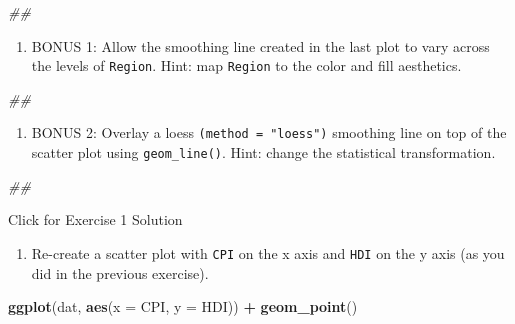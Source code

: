 \documentclass[]{book}
\newenvironment{Shaded}{\begin{snugshade}}{\end{snugshade}}
\newcommand{\CommentTok}[1]{\textcolor[rgb]{0.56,0.35,0.01}{\textit{#1}}}
\newcommand{\DataTypeTok}[1]{\textcolor[rgb]{0.13,0.29,0.53}{#1}}
\newcommand{\KeywordTok}[1]{\textcolor[rgb]{0.13,0.29,0.53}{\textbf{#1}}}
\newcommand{\NormalTok}[1]{#1}
\newcommand{\OperatorTok}[1]{\textcolor[rgb]{0.81,0.36,0.00}{\textbf{#1}}}
\newcommand{\StringTok}[1]{\textcolor[rgb]{0.31,0.60,0.02}{#1}}
\providecommand{\tightlist}{%
  \setlength{\itemsep}{0pt}\setlength{\parskip}{0pt}}
\begin{document}
\begin{Shaded}
\begin{Highlighting}[]
\CommentTok{## }
\end{Highlighting}
\end{Shaded}

\begin{enumerate}
\def\labelenumi{\arabic{enumi}.}
\setcounter{enumi}{4}
\tightlist
\item
  BONUS 1: Allow the smoothing line created in the last plot to vary across the levels of \texttt{Region}. Hint: map \texttt{Region} to the color and fill aesthetics.
\end{enumerate}

\begin{Shaded}
\begin{Highlighting}[]
\CommentTok{## }
\end{Highlighting}
\end{Shaded}

\begin{enumerate}
\def\labelenumi{\arabic{enumi}.}
\setcounter{enumi}{5}
\tightlist
\item
  BONUS 2: Overlay a loess \texttt{(method\ =\ "loess")} smoothing line on top of the scatter plot using \texttt{geom\_line()}. Hint: change the statistical transformation.
\end{enumerate}

\begin{Shaded}
\begin{Highlighting}[]
\CommentTok{## }
\end{Highlighting}
\end{Shaded}

{Click for Exercise 1 Solution}

\begin{enumerate}
\def\labelenumi{\arabic{enumi}.}
\tightlist
\item
  Re-create a scatter plot with \texttt{CPI} on the x axis and \texttt{HDI} on the y axis (as you did in the previous exercise).
\end{enumerate}

\begin{Shaded}
\begin{Highlighting}[]
\KeywordTok{ggplot}\NormalTok{(dat, }\KeywordTok{aes}\NormalTok{(}\DataTypeTok{x =}\NormalTok{ CPI, }\DataTypeTok{y =}\NormalTok{ HDI)) }\OperatorTok{+}
\StringTok{  }\KeywordTok{geom_point}\NormalTok{()}
\end{Highlighting}
\end{Shaded}
\end{document}
